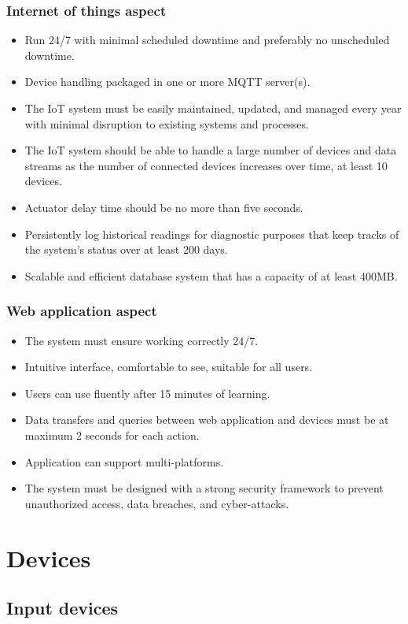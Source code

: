 \documentclass[a4paper, 13pt]{article}
\theoremstyle{definition}
\begin{document}
\subsubsection{Internet of things aspect}
\begin{itemize}
    \item Run 24/7 with minimal scheduled downtime and preferably no unscheduled downtime.
    \item Device handling packaged in one or more MQTT server(s).
    \item The IoT system must be easily maintained, updated, and managed every year with minimal disruption to existing systems and processes.
    \item The IoT system should be able to handle a large number of devices and data streams as the number of connected devices increases over time, at least 10 devices.
    \item Actuator delay time should be no more than five seconds.
    \item Persistently log historical readings for diagnostic purposes that keep tracks of the system’s status over at least 200 days.
    \item Scalable and efficient database system that has a capacity of at least 400MB.
\end{itemize}
\subsubsection{Web application aspect}
\begin{itemize}
    \item The system must ensure working correctly 24/7.
    \item Intuitive interface, comfortable to see, suitable for all users.
    \item Users can use fluently after 15 minutes of learning.
    \item Data transfers and queries between web application and devices must be at maximum 2 seconds for each action.
    \item Application can support multi-platforms.
    \item The system must be designed with a strong security framework to prevent unauthorized access, data breaches, and cyber-attacks.
\end{itemize}
\section{Devices}
\subsection{Input devices}
\end{document}
